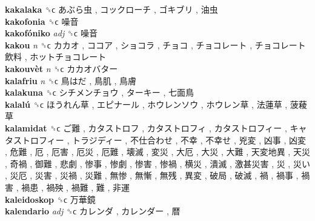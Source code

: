 \textbf{kakalaka} ␝ϲ   あぶら虫 ,  コックローチ ,  ゴキブリ ,  油虫   \\
\textbf{kakofonia} ␝ϲ   噪音   \\
\textbf{kakofóniko} \emph{adj}  ␝ϲ   噪音   \\
\textbf{kakou} \emph{n}  ␝ϲ   カカオ ,  ココア ,  ショコラ ,  チョコ ,  チョコレート ,  チョコレート飲料 ,  ホットチョコレート   \\
\textbf{kakouvèt} \emph{n}  ␝ϲ   カカオバター   \\
\textbf{kalafriu} \emph{n}  ␝ϲ   鳥はだ ,  鳥肌 ,  鳥膚   \\
\textbf{kalakuna} ␝ϲ   シチメンチョウ ,  ターキー ,  七面鳥   \\
\textbf{kalalú} ␝ϲ   ほうれん草 ,  エピナール ,  ホウレンソウ ,  ホウレン草 ,  法蓮草 ,  菠薐草   \\
\textbf{kalamidat} ␝ϲ   ご難 ,  カタストロフ ,  カタストロフィ ,  カタストロフィー ,  キャタストロフィー ,  トラジディー ,  不仕合わせ ,  不幸 ,  不幸せ ,  兇変 ,  凶事 ,  凶変 ,  危難 ,  厄 ,  厄害 ,  厄災 ,  厄難 ,  壊滅 ,  変災 ,  大厄 ,  大災 ,  大難 ,  天変地異 ,  天災 ,  奇禍 ,  御難 ,  悲劇 ,  惨事 ,  惨劇 ,  惨害 ,  惨禍 ,  横災 ,  潰滅 ,  激甚災害 ,  災 ,  災い ,  災厄 ,  災害 ,  災禍 ,  災難 ,  無惨 ,  無慚 ,  無残 ,  異変 ,  破局 ,  破滅 ,  禍 ,  禍事 ,  禍害 ,  禍患 ,  禍殃 ,  禍難 ,  難 ,  非運   \\
\textbf{kaleidoskop} ␝ϲ   万華鏡   \\
\textbf{kalendario} \emph{adj}  ␝ϲ   カレンダ ,  カレンダー ,  暦   \\
